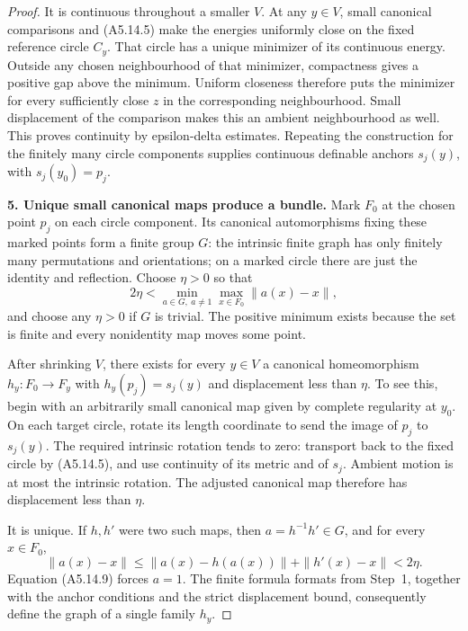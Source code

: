 \begin{proof}
It is continuous throughout a smaller $V$.  At any $y\in V$,
small canonical comparisons and (A5.14.5) make the energies
uniformly close on the fixed reference circle $C_y$.  That
circle has a unique minimizer of its continuous energy.
Outside any chosen neighbourhood of that minimizer, compactness
gives a positive gap above the minimum.  Uniform closeness
therefore puts the minimizer for every sufficiently close
$z$ in the corresponding neighbourhood.  Small displacement
of the comparison makes this an ambient neighbourhood as well.
This proves continuity by epsilon-delta estimates.  Repeating
the construction for the finitely many circle components
supplies continuous definable anchors $s_j(y)$, with
$s_j(y_0)=p_j$.

\medskip\noindent\textbf{5. Unique small canonical maps produce a bundle.}
Mark $F_0$ at the chosen point $p_j$ on each circle component.
Its canonical automorphisms fixing these marked points form
a finite group $G$: the intrinsic finite graph has only
finitely many permutations and orientations; on a marked
circle there are just the identity and reflection.  Choose
$\eta>0$ so that
\[
 2\eta<\min_{a\in G,\ a\ne1}\max_{x\in F_0}\|a(x)-x\|,
 \tag{A5.14.9}
\]
and choose any $\eta>0$ if $G$ is trivial.  The positive
minimum exists because the set is finite and every nonidentity
map moves some point.

After shrinking $V$, there exists for every $y\in V$ a
canonical homeomorphism $h_y:F_0\to F_y$ with
$h_y(p_j)=s_j(y)$ and displacement less than $\eta$.
To see this, begin with an arbitrarily small canonical map
given by complete regularity at $y_0$.  On each target circle,
rotate its length coordinate to send the image of $p_j$ to
$s_j(y)$.  The required intrinsic rotation tends to zero:
transport back to the fixed circle by (A5.14.5), and use
continuity of its metric and of $s_j$.  Ambient motion is
at most the intrinsic rotation.  The adjusted canonical map
therefore has displacement less than $\eta$.

It is unique.  If $h,h'$ were two such maps, then
$a=h^{-1}h'\in G$, and for every $x\in F_0$,
\[
 \|a(x)-x\|\leq\|a(x)-h(a(x))\|+\|h'(x)-x\|<2\eta.
\]
Equation (A5.14.9) forces $a=1$.  The finite formula formats
from Step~1, together with the anchor conditions and the
strict displacement bound, consequently define the graph of
a single family $h_y$.


\end{proof}
